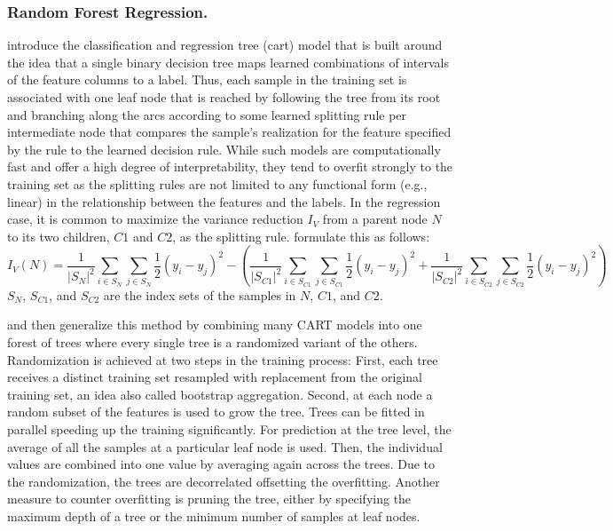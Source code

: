 \subsubsection{Random Forest Regression.}
\label{rf}

\cite{breiman1984} introduce the classification and regression tree
    (\gls{cart}) model that is built around the idea that a single binary
    decision tree maps learned combinations of intervals of the feature
    columns to a label.
Thus, each sample in the training set is associated with one leaf node that
    is reached by following the tree from its root and branching along the
    arcs according to some learned splitting rule per intermediate node that
    compares the sample's realization for the feature specified by the rule to
    the learned decision rule.
While such models are computationally fast and offer a high degree of
    interpretability, they tend to overfit strongly to the training set as
    the splitting rules are not limited to any functional form (e.g., linear)
    in the relationship between the features and the labels.
In the regression case, it is common to maximize the variance reduction $I_V$
    from a parent node $N$ to its two children, $C1$ and $C2$, as the
    splitting rule.
\cite{breiman1984} formulate this as follows:
$$
I_V(N)
=
\frac{1}{|S_N|^2} \sum_{i \in S_N} \sum_{j \in S_N}
    \frac{1}{2} (y_i - y_j)^2
- \left(
    \frac{1}{|S_{C1}|^2} \sum_{i \in S_{C1}} \sum_{j \in S_{C1}}
        \frac{1}{2} (y_i - y_j)^2
    +
    \frac{1}{|S_{C2}|^2} \sum_{i \in S_{C2}} \sum_{j \in S_{C2}}
        \frac{1}{2} (y_i - y_j)^2
\right)
$$
$S_N$, $S_{C1}$, and $S_{C2}$ are the index sets of the samples in $N$, $C1$,
    and $C2$. 

\cite{ho1998} and then \cite{breiman2001} generalize this method by combining
    many CART models into one forest of trees where every single tree is
    a randomized variant of the others.
Randomization is achieved at two steps in the training process:
First, each tree receives a distinct training set resampled with replacement
    from the original training set, an idea also called bootstrap
    aggregation.
Second, at each node a random subset of the features is used to grow the tree.
Trees can be fitted in parallel speeding up the training significantly.
For prediction at the tree level, the average of all the samples at a
    particular leaf node is used.
Then, the individual values are combined into one value by averaging again
    across the trees.
Due to the randomization, the trees are decorrelated offsetting the
    overfitting.
Another measure to counter overfitting is pruning the tree, either by
    specifying the maximum depth of a tree or the minimum number of samples
    at leaf nodes.

